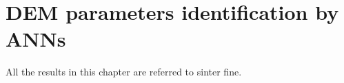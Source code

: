 
\chapter{DEM parameters identification by ANNs}
\label{cap:demparameters}

All the results in this chapter are referred to sinter fine.

% 
% 
% 
% 
% 
% 
%   

